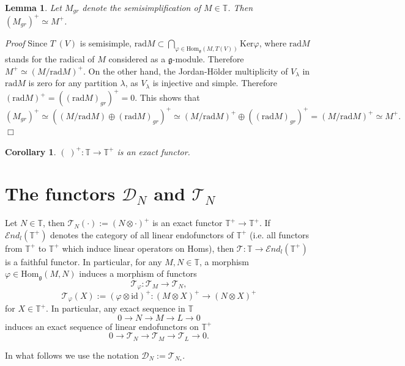 \documentclass[11pt]{amsart}
\newcounter{theorem}
\newtheorem{lemma}[theo]{Lemma}
\newtheorem{corollary}[theo]{Corollary}
\renewenvironment{proof}{ \emph{Proof}}{$\Box$}
\newcommand{\TT}{\mathbb{T}}
\newcommand{\id}{\mathrm{id}}
\renewcommand{\gg}{\mathfrak{g}}
\renewcommand {\phi} {\varphi}
\newcommand{\Ker}{\mathrm{Ker}}
\newcommand{\rad}{\mathrm{rad}}
\newcommand{\Hom}{\mathrm{Hom}}
\newcommand{\field}[1]{\mathbb{#1}}
\begin{document}
\begin{lemma}\label{lemma1}
Let $M_{gr}$ denote the semisimplification of $M\in\field{T}$. Then $(M_{gr})^+\simeq M^+$.
\end{lemma}

\begin{proof}
Since $T^\cdot(V)$ is semisimple, $\rad M\subset\bigcap_{\phi\in\Hom_\gg(M,T(V))}\Ker\phi$, 
where $\rad M$ stands for the radical of $M$ considered as a $\gg$-module.
Therefore $M^+\simeq(M/\rad M)^+$. On the other hand, the Jordan-H\"{o}lder multiplicity
of $V_\lambda$ in $\rad M$ is zero for any partition $\lambda$, as $V_\lambda$ is injective
and simple. Therefore $(\rad M)^+=((\rad M)_{gr})^+=0$. This shows that 
$$(M_{gr})^+\simeq((M/\rad M)\oplus(\rad M)_{gr})^+\simeq(M/\rad M)^+\oplus((\rad M)_{gr})^+ = (M/\rad M)^+\simeq M^+.$$
\end{proof}

\begin{corollary}\label{cor2}
$(\;)^+:\field T\to \field T^+$ is an exact functor.
\end{corollary}



\section{The functors $\mathcal D_N$ and $\mathcal T_N$}

Let $N\in\mathbb T$, then $\mathcal T_N(\cdot):=(N\otimes \cdot)^+$ is an exact functor $\mathbb T^+\to\mathbb T^+$. 
If $\mathcal{E}nd_l(\mathbb T^+)$ denotes the category of all linear
endofunctors of $\mathbb T^+$ (i.e. all functors from $\TT^+$ to $\TT^+$ which induce linear operators on Homs), 
then $\mathcal T:\TT\to\mathcal{E}nd_l(\TT^+)$ is a faithful functor.
In particular, for any $M,N\in\TT$, a morphism $\varphi\in\Hom_\gg(M,N)$ induces a morphism of functors 
$$\mathcal T_{\varphi}:\mathcal T_M\to\mathcal T_N,$$
$$\mathcal T_{\varphi}(X):=(\varphi\otimes\id)^+:(M\otimes X)^+\to(N\otimes X)^+$$ 
for $X\in\TT^+$.
In particular, any exact sequence in $\TT$ 
$$0\to N\to M \to L\to 0$$
induces an exact sequence of linear endofunctors on $\TT^+$
$$0\to \mathcal T_N\to \mathcal T_M \to \mathcal T_L\to 0.$$


In what follows we use the notation $\mathcal D_N:=\mathcal T_{N_*}$.
\end{document}
